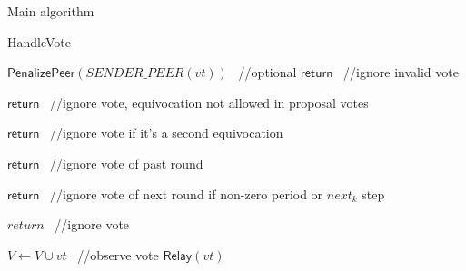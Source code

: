 \documentclass[10pt,a4paper]{article}
\begin{document}
\begin{section}{Main algorithm}
\begin{subsection}{HandleVote}
\begin{algorithm}[H]
\begin{algorithmic}[1]
            
            


                \State $\mathsf{PenalizePeer}(SENDER\_PEER(vt))$ \ //optional
                \State $\mathsf{return}$ \ //ignore invalid vote
            \EndIf

                \State $\mathsf{return}$ \ //ignore vote, equivocation not allowed in proposal votes
            \EndIf

                \State $\mathsf{return}$ \ //ignore vote if it's a second equivocation
            \EndIf

                \State $\mathsf{return}$ \ //ignore vote of past round
            \EndIf

                \State $\mathsf{return}$ \ //ignore vote of next round if non-zero period or $next_k$ step
            \EndIf

                \State $return$ \ //ignore vote
            \EndIf

            \State $V \gets V \cup vt$ \ //observe vote
            \State $\mathsf{Relay}(vt)$


\end{algorithmic}
\end{algorithm}
\end{subsection}
\end{section}
\end{document}
